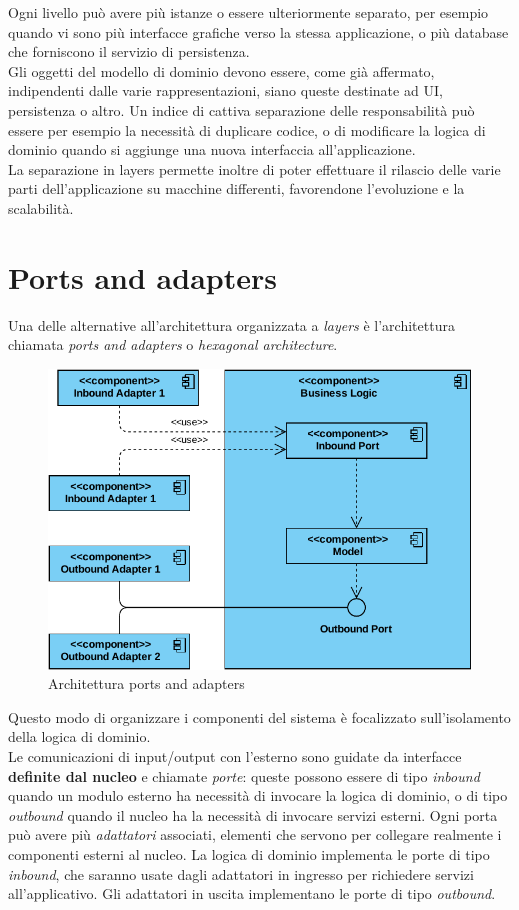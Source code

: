 Ogni livello può avere più istanze o essere ulteriormente separato, per esempio quando vi sono più interfacce grafiche verso la stessa applicazione, o più database che forniscono il servizio di persistenza.\\
Gli oggetti del modello di dominio devono essere, come già affermato, indipendenti dalle varie rappresentazioni, siano queste destinate ad UI, persistenza o altro.
Un indice di cattiva separazione delle responsabilità può essere per esempio la necessità di duplicare codice, o di modificare la logica di dominio quando si aggiunge una nuova interfaccia all'applicazione.\\
La separazione in layers permette inoltre di poter effettuare il rilascio delle varie parti dell'applicazione su macchine differenti, favorendone l'evoluzione e la scalabilità.
\section{Ports and adapters}

Una delle alternative all'architettura organizzata a \textit{layers} è l'architettura chiamata \textit{ports and adapters} o \textit{hexagonal architecture}\cite{microservices_architecture}.

\begin{figure}[h]
	\centering
	\includegraphics[width=\textwidth]{img/hexagonal-component-diagram}
	\caption{Architettura ports and adapters}
	\label{fig:hexagonal-architecture}
\end{figure}

Questo modo di organizzare i componenti del sistema è focalizzato sull'isolamento della logica di dominio.\\
Le comunicazioni di input/output con l'esterno sono guidate da interfacce \textbf{definite dal nucleo} e chiamate \textit{porte}: queste possono essere di tipo \textit{inbound} quando un modulo esterno ha necessità di invocare la logica di dominio, o di tipo \textit{outbound} quando il nucleo ha la necessità di invocare servizi esterni.
Ogni porta può avere più \textit{adattatori} associati, elementi che servono per collegare realmente i componenti esterni al nucleo.
La logica di dominio implementa le porte di tipo \textit{inbound}, che saranno usate dagli adattatori in ingresso per richiedere servizi all'applicativo.
Gli adattatori in uscita implementano le porte di tipo \textit{outbound}.

